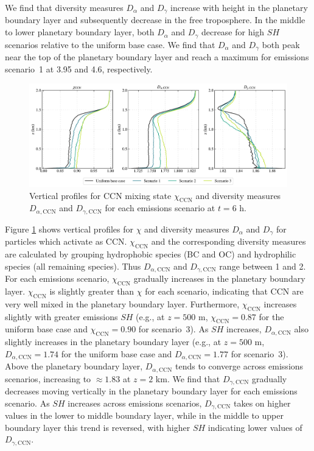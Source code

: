We find that diversity measures $D_{\alpha}$ and $D_{\gamma}$ increase with height in the planetary boundary layer and subsequently decrease in the free troposphere. In the middle to lower planetary boundary layer, both $D_{\alpha}$ and $D_{\gamma}$ decrease for high $SH$ scenarios relative to the uniform base case. We find that $D_{\alpha}$ and $D_{\gamma}$ both peak near the top of the planetary boundary layer and reach a maximum for emissions scenario~1 at 3.95 and 4.6, respectively. 

\begin{figure}[!t]
  \centering
    \includegraphics[width=\textwidth]{figures/chapter5/aerosol-ccn-mixingstate-vertical-profiles-time36.pdf}
    \caption{Vertical profiles for CCN mixing state $\chi_{\text{CCN}}$ and diversity measures $D_{\alpha,\text{CCN}}$ and $D_{\gamma,\text{CCN}}$ for each emissions scenario at $t=6$ h.}
    \label{fig:ccn-mixing-state-vert-profiles}
\end{figure}

Figure \ref{fig:ccn-mixing-state-vert-profiles} shows vertical profiles for $\chi$ and diversity measures $D_{\alpha}$ and $D_{\gamma}$ for particles which activate as CCN. $\chi_{\text{CCN}}$ and the corresponding diversity measures are calculated by grouping hydrophobic species (BC and OC) and hydrophilic species (all remaining species). Thus $D_{\alpha,\text{CCN}}$ and $D_{\gamma,\text{CCN}}$ range between 1 and 2. For each emissions scenario, $\chi_{\text{CCN}}$ gradually increases in the planetary boundary layer. $\chi_{\text{CCN}}$ is slightly greater than $\chi$ for each scenario, indicating that CCN are very well mixed in the planetary boundary layer. Furthermore, $\chi_{\text{CCN}}$ increases slightly with greater emissions $SH$ (e.g., at $z=500$ m, $\chi_{\text{CCN}} = 0.87$ for the uniform base case and $\chi_{\text{CCN}} = 0.90$ for scenario~3). As $SH$ increases, $D_{\alpha,\text{CCN}}$ also slightly increases in the planetary boundary layer (e.g., at $z=500$ m, $D_{\alpha,\text{CCN}} = 1.74$ for the uniform base case and $D_{\alpha,\text{CCN}} = 1.77$ for scenario~3). Above the planetary boundary layer, $D_{\alpha,\text{CCN}}$ tends to converge across emissions scenarios, increasing to $\approx1.83$ at $z=2$ km. We find that $D_{\gamma,\text{CCN}}$ gradually decreases moving vertically in the planetary boundary layer for each emissions scenario. As $SH$ increases across emissions scenarios, $D_{\gamma,\text{CCN}}$ takes on higher values in the lower to middle boundary layer, while in the middle to upper boundary layer this trend is reversed, with higher $SH$ indicating lower values of $D_{\gamma,\text{CCN}}$. 

